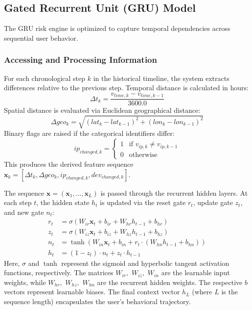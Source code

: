 \documentclass[pdflatex,sn-mathphys-num]{sn-jnl}
\theoremstyle{thmstyleone}%
\theoremstyle{thmstyletwo}%
\theoremstyle{thmstylethree}%
\begin{document}
\subsection{Gated Recurrent Unit (GRU) Model}
The GRU risk engine is optimized to capture temporal dependencies across sequential user behavior.

\subsubsection{Accessing and Processing Information}
For each chronological step $k$ in the historical timeline, the system extracts differences relative to the previous step. Temporal distance is calculated in hours:
\begin{equation}
\Delta t_k = \frac{v_{time, k} - v_{time, k-1}}{3600.0} \tag{11}
\end{equation}
Spatial distance is evaluated via Euclidean geographical distance:
\begin{equation}
\Delta geo_k = \sqrt{(lat_k - lat_{k-1})^2 + (lon_k - lon_{k-1})^2} \tag{12}
\end{equation}
Binary flags are raised if the categorical identifiers differ:
\begin{equation}
ip_{changed, k} = \begin{cases} 1 & \text{if } v_{ip, k} \neq v_{ip, k-1} \\ 0 & \text{otherwise} \end{cases} \tag{13}
\end{equation}
This produces the derived feature sequence $\mathbf{x}_k = [\Delta t_k, \Delta geo_k, ip_{changed, k}, dev_{changed, k}]$.

The sequence $\mathbf{x} = (\mathbf{x}_1, \dots, \mathbf{x}_L)$ is passed through the recurrent hidden layers. At each step $t$, the hidden state $h_t$ is updated via the reset gate $r_t$, update gate $z_t$, and new gate $n_t$:
\begin{align}
r_t &= \sigma(W_{ir} \mathbf{x}_t + b_{ir} + W_{hr} h_{t-1} + b_{hr}) \tag{14}\\
z_t &= \sigma(W_{iz} \mathbf{x}_t + b_{iz} + W_{hz} h_{t-1} + b_{hz}) \tag{15}\\
n_t &= \tanh(W_{in} \mathbf{x}_t + b_{in} + r_t \cdot (W_{hn} h_{t-1} + b_{hn})) \tag{16}\\
h_t &= (1 - z_t) \cdot n_t + z_t \cdot h_{t-1} \tag{17}
\end{align}
Here, $\sigma$ and $\tanh$ represent the sigmoid and hyperbolic tangent activation functions, respectively. The matrices $W_{ir}, $ $W_{iz}, $ $W_{in}$ are the learnable input weights, while $W_{hr}, $ $W_{hz}, $ $W_{hn}$ are the recurrent hidden weights. The respective $b$ vectors represent learnable biases. The final context vector $h_L$ (where $L$ is the sequence length) encapsulates the user's behavioral trajectory.
\end{document}
